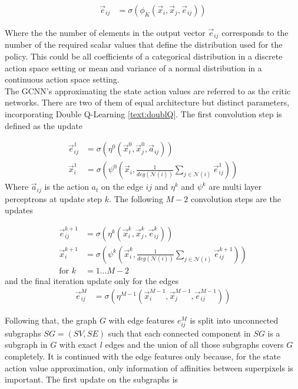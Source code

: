 \begin{align}
\vec{e}_{ij} &= \sigma \left( \phi_K \left(\vec{x}_i, \vec{x}_j, \vec{e}_{ij} \right)\right)
\end{align}

Where the the number of elements in the output vector $\vec{e}_{ij}$ corresponds to the number of the required scalar values that define the distribution used for the policy. This could be all coefficients of a categorical distribution in a discrete action space setting or mean and variance of a normal distribution in a continuous action space setting.\\

The GCNN's approximating the state action values are referred to as the critic networks. There are two of them of equal architecture but distinct parameters, incorporating Double Q-Learning \ref{text:doublQ}. The first convolution step is defined as the update

\begin{align}
\vec{e}_{ij}^1 &= \sigma \left( \eta^0 \left(\vec{x}_i^0, \vec{x}_j^0, \vec{a}_{ij} \right)\right)\\
\vec{x}_i^1 &= \sigma \left( \psi^0 \left(\vec{x}_i, \frac{1}{deg(\mathcal{N}(i))} \sum_{j \in \mathcal{N}(i)}  \vec{e}_{ij}^1 \right)\right)
\end{align}
Where $\vec{a}_{ij}$ is the action $a_t$ on the edge $ij$ and $\eta^k$ and $\psi^k$
are multi layer perceptrons at update step $k$.
The following $M-2$ convolution steps are the updates

\begin{align}
\vec{e}_{ij}^{k+1} &= \sigma \left( \eta^k \left(\vec{x}_i^k, \vec{x}_j^k, \vec{e}_{ij}^k \right)\right)\\
\vec{x}_i^{k+1} &= \sigma \left( \psi^k \left(\vec{x}_i^k, \frac{1}{deg(\mathcal{N}(i))} \sum_{j \in \mathcal{N}(i)}  \vec{e}_{ij}^{k+1} \right)\right)\\
\text{for }k&=1...M-2
\end{align}
and the final iteration update only for the edges
\begin{align}
\vec{e}_{ij}^M &= \sigma \left( \eta^{M-1} \left(\vec{x}_i^{M-1}, \vec{x}_j^{M-1}, \vec{e}_{ij}^{M-1} \right)\right)
\end{align}

Following that, the graph $G$ with edge features $e_{ij}^M$ is split into unconnected subgraphs $SG=(SV,SE)$ such that each connected component in $SG$ is a subgraph in $G$ with exact $l$ edges and the union of all those subgraphs covers $G$ completely. It is continued with the edge features only because, for the state action value approximation, only information of affinities between superpixels is important. The first update on the subgraphs is

